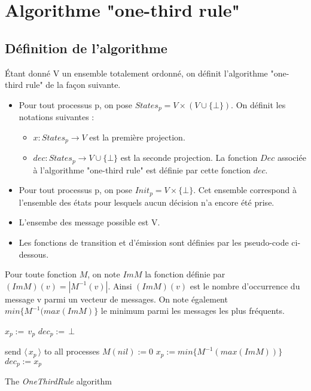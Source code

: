 \documentclass{article}
\begin{document}
\section{Algorithme "one-third rule"}
\subsection{Définition de l'algorithme}

Étant donné V un ensemble totalement ordonné, on définit l'algorithme "one-third rule" de la façon suivante.
\begin{itemize}
	\item Pour tout processus p, on pose $States_p = V \times (V \cup \{ \bot \})$.
	On définit les notations suivantes :
	\begin{itemize}

		\item $x : States_p \rightarrow V$ est la première projection.
		\item $dec : States_p \rightarrow V \cup \{\bot\}$ est la seconde projection. La fonction $Dec$ associée à l'algorithme "one-third rule" est définie par cette fonction $dec$.

	\end{itemize}
\item Pour tout processus p, on pose $Init_p = V \times \{ \bot \}$. Cet ensemble correspond à l'ensemble des états pour lesquels aucun décision n'a encore été prise.
\item L'ensembe des message possible est V. 
\item Les fonctions de transition et d'émission sont définies par les pseudo-code ci-dessous.
\end{itemize}
Pour toute fonction $M$, on note $Im M$ la fonction définie par $(Im M)(v) = |M^{-1}(v)|$. Ainsi $(Im M)(v)$ est le nombre d'occurrence du message v parmi un vecteur de messages.
On note également $min \{M^{-1} (max (Im M)\}$  le minimum parmi les messages les plus fréquents.

\begin{algorithm}[htb]
\begin{distribalgo}[1]
\BLANK {}
  \STATE $x_p :=\, v_p$ 
  \STATE $dec_p :=\, \bot$ 

\ENDINDENT \BLANK

    \STATE send $\langle\, x_p\, \rangle$ to all processes
  \ENDINDENT
  \BLANK
	\STATE $M(nil) := 0$ 
	  \STATE $x_p := min \{M^{-1} (max (Im M))\}$ 
		  \STATE $dec_p := x_p$ 
        \ENDIF
      \ENDIF
  \ENDINDENT
\ENDINDENT \BLANK


\caption{The {\em OneThirdRule} algorithm} \label{algo:R}
\end{distribalgo}

\end{algorithm}
\end{document}
